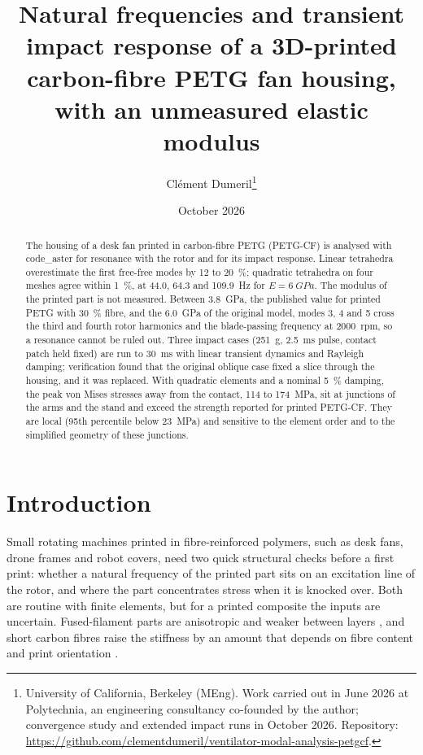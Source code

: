 \documentclass[11pt]{article}
\title{Natural frequencies and transient impact response of a 3D-printed carbon-fibre PETG fan housing,
with an unmeasured elastic modulus}
\author{Cl\'ement Dumeril\thanks{University of California, Berkeley (MEng). Work carried out in June 2026 at
Polytechnia, an engineering consultancy co-founded by the author; convergence study and extended impact runs in
October 2026. Repository: \url{https://github.com/clementdumeril/ventilator-modal-analysis-petgcf}.}}
\date{October 2026}
\begin{document}
\maketitle

\begin{abstract}
The housing of a desk fan printed in carbon-fibre PETG (PETG-CF) is analysed with code\_aster for resonance with
the rotor and for its impact response. Linear tetrahedra overestimate the first free-free modes by 12 to \SI{20}{\%};
quadratic tetrahedra on four meshes agree within \SI{1}{\%}, at 44.0, 64.3 and \SI{109.9}{Hz} for $E=\SI{6}{GPa}$. The
modulus of the printed part is not measured. Between \SI{3.8}{GPa}, the published value for printed PETG with
\SI{30}{\%} fibre, and the \SI{6.0}{GPa} of the original model, modes 3, 4 and 5 cross the third and fourth rotor
harmonics and the blade-passing frequency at \SI{2000}{rpm}, so a resonance cannot be ruled out. Three impact cases
(\SI{251}{g}, \SI{2.5}{ms} pulse, contact patch held fixed) are run to \SI{30}{ms} with linear transient dynamics and
Rayleigh damping; verification found that the original oblique case fixed a slice through the housing, and it was
replaced. With quadratic elements and a nominal \SI{5}{\%} damping, the peak von Mises stresses away from the contact,
114 to \SI{174}{MPa}, sit at junctions of the arms and the stand and exceed the strength reported for printed PETG-CF.
They are local (95th percentile below \SI{23}{MPa}) and sensitive to the element order and to the simplified geometry
of these junctions.
\end{abstract}

\section{Introduction}

Small rotating machines printed in fibre-reinforced polymers, such as desk fans, drone frames and robot covers, need
two quick structural checks before a first print: whether a natural frequency of the printed part sits on an
excitation line of the rotor, and where the part concentrates stress when it is knocked over. Both are routine with
finite elements, but for a printed composite the inputs are uncertain. Fused-filament parts are anisotropic and
weaker between layers \citep{ahn2002}, and short carbon fibres raise the stiffness by an amount that depends on fibre
content and print orientation \citep{tekinalp2014,prabhakaran2025,batista2023}.
\end{document}

